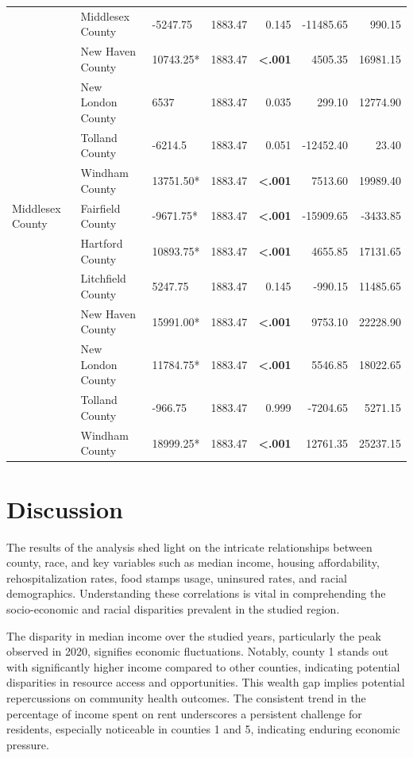 \documentclass[12pt]{article}
\begin{document}
\begin{table}[htbp]
{\begin{tabular}{lllrrrr}
    & Middlesex County & -5247.75 & 1883.47 & 0.145 & -11485.65 & 990.15 \\
    & New Haven County & 10743.25* & 1883.47 & \textbf{<.001} & 4505.35 & 16981.15 \\
    & New London County & 6537 & 1883.47 & 0.035 & 299.10 & 12774.90 \\
    & Tolland County & -6214.5 & 1883.47 & 0.051 & -12452.40 & 23.40 \\
    & Windham County & 13751.50* & 1883.47 & \textbf{<.001} & 7513.60 & 19989.40 \\
    \midrule
    Middlesex County & Fairfield County & -9671.75* & 1883.47 & \textbf{<.001} & -15909.65 & -3433.85 \\
    & Hartford County & 10893.75* & 1883.47 & \textbf{<.001} & 4655.85 & 17131.65 \\
    & Litchfield County & 5247.75 & 1883.47 & 0.145 & -990.15 & 11485.65 \\
    & New Haven County & 15991.00* & 1883.47 & \textbf{<.001} & 9753.10 & 22228.90 \\
    & New London County & 11784.75* & 1883.47 & \textbf{<.001} & 5546.85 & 18022.65 \\
    & Tolland County & -966.75 & 1883.47 & 0.999 & -7204.65 & 5271.15 \\
    & Windham County & 18999.25* & 1883.47 & \textbf{<.001} & 12761.35 & 25237.15 \\
    \bottomrule
  \end{tabular}%
  }
\end{table}
    

\section{Discussion}\label{sec:disc}

The results of the analysis shed light on the intricate relationships between county, race, and key 
variables such as median income, housing affordability, rehospitalization rates, food stamps usage, 
uninsured rates, and racial demographics. Understanding these correlations is vital in comprehending 
the socio-economic and racial disparities prevalent in the studied region.

The disparity in median income over the studied years, particularly the peak observed in 2020, 
signifies economic fluctuations. Notably, county 1 stands out with significantly higher income 
compared to other counties, indicating potential disparities in resource access and opportunities. 
This wealth gap implies potential repercussions on community health outcomes. The consistent trend in 
the percentage of income spent on rent underscores a persistent challenge for residents, especially 
noticeable in counties 1 and 5, indicating enduring economic pressure.
\end{document}
